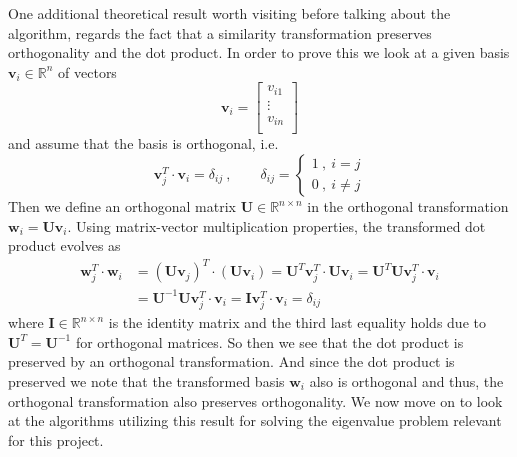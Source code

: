 \documentclass[12pt]{article}
\numberwithin{figure}{section}
\numberwithin{table}{section}
\begin{document}
\noindent One additional theoretical result worth visiting before talking about the algorithm, regards the fact that a similarity transformation preserves orthogonality and the dot product. In order to prove this we look at a given basis $\mathbf{v}_i\in\mathbb{R}^n$ of vectors
\begin{equation*}
    \mathbf{v}_i=
        \begin{bmatrix}
        	v_{i1} \\
            \vdots \\
            v_{in} \\
        \end{bmatrix}
\end{equation*}
and assume that the basis is orthogonal, i.e.
\begin{equation*}
	\mathbf{v}_j^T\cdot\mathbf{v}_i=\delta_{ij} \ , \qquad \delta_{ij}=
    	\begin{cases}
			1 \ , \ i=j\\
			0 \ , \ i\neq j
		\end{cases}
\end{equation*}
Then we define an orthogonal matrix $\mathbf{U}\in\mathbb{R}^{n\times n}$ in the orthogonal transformation $\mathbf{w}_i=\mathbf{U}\mathbf{v}_i$. Using matrix-vector multiplication properties, the transformed dot product evolves as
\begin{align*}
	\mathbf{w}_j^T\cdot\mathbf{w}_i&=(\mathbf{U}\mathbf{v}_j)^T\cdot (\mathbf{U}\mathbf{v}_i)=\mathbf{U}^T\mathbf{v}_j^T\cdot \mathbf{U}\mathbf{v}_i=\mathbf{U}^T\mathbf{U}\mathbf{v}_j^T\cdot\mathbf{v}_i \\
&=\mathbf{U}^{-1}\mathbf{U}\mathbf{v}_j^T\cdot\mathbf{v}_i=\mathbf{I}\mathbf{v}_j^T\cdot\mathbf{v}_i=\delta_{ij}
\end{align*}
where $\mathbf{I}\in\mathbb{R}^{n\times n}$ is the identity matrix and the third last equality holds due to $\mathbf{U}^T=\mathbf{U}^{-1}$ for orthogonal matrices. So then we see that the dot product is preserved by an orthogonal transformation. And since the dot product is preserved we note that the transformed basis $\mathbf{w}_i$ also is orthogonal and thus, the orthogonal transformation also preserves orthogonality. We now move on to look at the algorithms utilizing this result for solving the eigenvalue problem relevant for this project.


\end{document}
